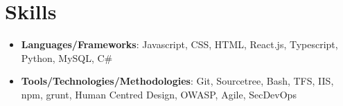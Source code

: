 \documentclass[letterpaper,10pt]{article}
\newcommand{\resumeSubHeadingListStart}{\begin{itemize}[leftmargin=*]}
\newcommand{\resumeSubHeadingListEnd}{\end{itemize}}
\begin{document}
\section{Skills}
 \resumeSubHeadingListStart
   \item{\textbf{Languages/Frameworks}{: Javascript, CSS, HTML, React.js, Typescript, Python, MySQL, C#}}
   \item{\textbf{Tools/Technologies/Methodologies}{: Git, Sourcetree, Bash, TFS, IIS, npm, grunt, 
Human Centred Design, OWASP, Agile, SecDevOps}}
 \resumeSubHeadingListEnd


\end{document}
